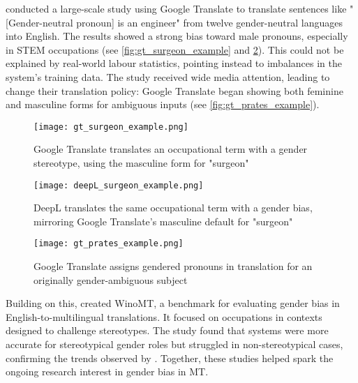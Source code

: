         \textcite{pratesAssessingGenderBias2019} conducted a large-scale study using Google Translate to translate sentences like "[Gender-neutral pronoun] is an engineer" from twelve gender-neutral languages into English. The results showed a strong bias toward male pronouns, especially in STEM occupations (see \autoref{fig:gt_surgeon_example} and \ref{fig:deepL_surgeon_example}). This could not be explained by real-world labour statistics, pointing instead to imbalances in the system's training data. The study received wide media attention, leading \citeauthor{googleReducingGenderBias2018} to change their translation policy: Google Translate began showing both feminine and masculine forms for ambiguous inputs \parencite{googleReducingGenderBias2018} (see \autoref{fig:gt_prates_example}).

        \vspace{0.8em}
        \begin{figure}[htb]
            \centering
            \texttt{[image: gt\_surgeon\_example.png]}
            \caption[Example of Google Translate's biased translation]{Google Translate translates an occupational term with a gender stereotype, using the masculine form for "surgeon"}
            \label{fig:gt_surgeon_example}
        \end{figure}

        \vspace{0.8em}
        \begin{figure}[htb]
            \centering
            \texttt{[image: deepL\_surgeon\_example.png]}
            \caption[Example of DeepL's biased translation]{DeepL translates the same occupational term with a gender bias, mirroring Google Translate's masculine default for "surgeon"}
            \label{fig:deepL_surgeon_example}
        \end{figure}

        \vspace{0.8em}
        \begin{figure}[htb]
            \centering
            \texttt{[image: gt\_prates\_example.png]}
            \caption[Google Translate Gendered Pronoun Suggestions]{Google Translate assigns gendered pronouns in translation for an originally gender-ambiguous subject}
            \label{fig:gt_prates_example}
        \end{figure}

        Building on this, \textcite{stanovskyEvaluatingGenderBias2019} created WinoMT, a benchmark for evaluating gender bias in English-to-multilingual translations. It focused on occupations in contexts designed to challenge stereotypes. The study found that systems were more accurate for stereotypical gender roles but struggled in non-stereotypical cases, confirming the trends observed by \citeauthor{pratesAssessingGenderBias2019}.
        Together, these studies helped spark the ongoing research interest in gender bias in MT.


